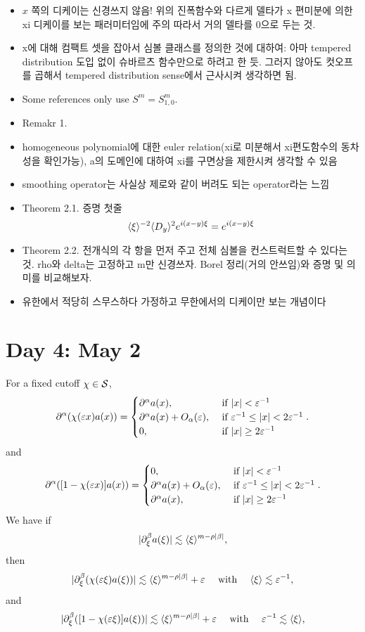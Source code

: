 \documentclass{../../small}
\begin{document}
\begin{itemize}
\item $x$ 쪽의 디케이는 신경쓰지 않음! 위의 진폭함수와 다르게 델타가 x 편미분에 의한 xi 디케이를 보는 패러미터임에 주의 따라서 거의 델타를 0으로 두는 것.
\item x에 대해 컴팩트 셋을 잡아서 심볼 클래스를 정의한 것에 대하여: 아마 tempered distribution 도입 없이 슈바르츠 함수만으로 하려고 한 듯. 그러지 않아도 컷오프를 곱해서 tempered distribution sense에서 근사시켜 생각하면 됨.
\item Some references only use $S^m=S_{1,0}^m$. %
\item Remakr 1. %
\item homogeneous polynomial에 대한 euler relation(xi로 미분해서 xi편도함수의 동차성을 확인가능), a의 도메인에 대하여 xi를 구면상을 제한시켜 생각할 수 있음
\item smoothing operator는 사실상 제로와 같이 버려도 되는 operator라는 느낌
\item Theorem 2.1. 증명 첫줄
\[\langle\xi\rangle^{-2}\langle D_y\rangle^2e^{i(x-y)\xi}=e^{i(x-y)\xi}\]
\item Theorem 2.2. 전개식의 각 항을 먼저 주고 전체 심볼을 컨스트럭트할 수 있다는 것. rho와 delta는 고정하고 m만 신경쓰자. Borel 정리(거의 안쓰임)와 증명 및 의미를 비교해보자.
\item 유한에서 적당히 스무스하다 가정하고 무한에서의 디케이만 보는 개념이다
\end{itemize}



\newpage
\section{Day 4: May 2}



For a fixed cutoff $\chi\in\mathcal{S}$,
\[\partial^\alpha(\chi(\varepsilon x)a(x))
=\begin{cases}
\partial^\alpha a(x),&\text{ if }|x|<\varepsilon^{-1}\\
\partial^\alpha a(x)+O_\alpha(\varepsilon),&\text{ if }\varepsilon^{-1}\le|x|<2\varepsilon^{-1}\\
0,&\text{ if }|x|\ge 2\varepsilon^{-1}
\end{cases}.\]
and
\[\partial^\alpha([1-\chi(\varepsilon x)]a(x))
=\begin{cases}
0,&\text{ if }|x|<\varepsilon^{-1}\\
\partial^\alpha a(x)+O_\alpha(\varepsilon),&\text{ if }\varepsilon^{-1}\le|x|<2\varepsilon^{-1}\\
\partial^\alpha a(x),&\text{ if }|x|\ge 2\varepsilon^{-1}
\end{cases}.\]
We have if
\[|\partial_\xi^\beta a(\xi)|\lesssim\langle\xi\rangle^{m-\rho|\beta|},\]
then
\[|\partial_\xi^\beta(\chi(\varepsilon\xi)a(\xi))|\lesssim\langle\xi\rangle^{m-\rho|\beta|}+\varepsilon\quad\text{ with }\quad\langle\xi\rangle\lesssim\varepsilon^{-1},\]
and
\[|\partial_\xi^\beta([1-\chi(\varepsilon\xi)]a(\xi))|\lesssim\langle\xi\rangle^{m-\rho|\beta|}+\varepsilon\quad\text{ with }\quad\varepsilon^{-1}\lesssim\langle\xi\rangle,\]
\end{document}
